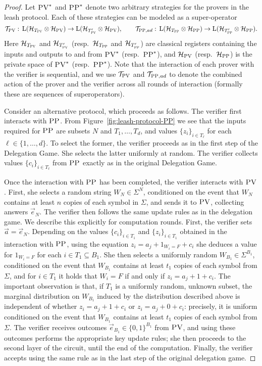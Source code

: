 \documentclass[11pt]{article}
\theoremstyle{remark}
\theoremstyle{definition}
\newcommand{\setft}[1]{\mathrm{#1}}
\newcommand{\Lin}{\setft{L}}
\newcommand{\mH}{\mathcal{H}}
\newcommand{\pv}{\textsc{PV}}
\newcommand{\pp}{\textsc{PP}}
\begin{document}
\begin{proof}
Let $\pv^*$ and $\pp^*$ denote two arbitrary strategies for the provers in the leash protocol. Each of these strategies can be modeled as a super-operator 
$$\mathcal{T}_\pv:\, \Lin(\mH_{T_\pv} \otimes \mH_\pv) \to \Lin(\mH_{T'_\pv} \otimes \mH_\pv), \qquad \mathcal{T}_{\pp,ad}: \,\Lin(\mH_{T_\pp} \otimes \mH_\pp) \to \Lin(\mH_{T'_\pp} \otimes \mH_\pp).$$
Here $\mH_{T_\pv}$ and $\mH_{T'_\pv}$ (resp.\ $\mH_{T_\pp}$ and $\mH_{T'_\pp}$) are classical registers containing the inputs and outputs to and from $\pv^*$ (resp.\ $\pp^*$), and $\mH_\pv$ (resp.\ $\mH_\pp$) is the private space of $\pv^*$ (resp.\ $\pp^*$). Note that the interaction of each prover with the verifier is sequential, and we use $\mathcal{T}_{\pv}$ and $\mathcal{T}_{\pp,ad}$ to denote the combined action of the prover and the verifier across all rounds of interaction (formally these are sequences of superoperators).

Consider an alternative protocol, which proceeds as follows. The verifier first interacts with $\pp$. From Figure~\ref{fig:leash-protocol-PP} we see that the inputs required for $\pp$ are subsets $N$ and $T_1,\ldots,T_d$, and values $\{z_i\}_{i\in T_\ell}$ for each $\ell\in\{1,\ldots,d\}$. To select the former, the verifier proceeds as in the first step of the Delegation Game. She selects the latter uniformly at random. The verifier collects values $\{c_i\}_{i\in T_\ell}$ from $\pp$ exactly as in the original Delegation Game. 

Once the interaction with $\pp$ has been completed, the verifier interacts with $\pv$. First, she selects a random string $W_N\in \Sigma^N$, conditioned on the event that $W_N$ contains at least $n$ copies of each symbol in $\Sigma$, and sends it to $\pv$, collecting answers $\vec{e}_N$. The verifier then follows the same update rules as in the delegation game. We describe this explicitly for computation rounds. First, the verifier sets $\vec{a} = \vec{e}_N$. Depending on the values $\{c_i\}_{i\in T_1}$ and $\{z_i\}_{i\in T_1}$ obtained in the interaction with $\pp$, using the equation $z_i = a_j + 1_{W_i=F}+c_i$ she deduces a value for $1_{W_i=F}$ for each $i\in T_1 \subseteq B_1$. She then selects a uniformly random $W_{B_1} \in \Sigma^{B_1}$, conditioned on the event that $W_{B_1}$ contains at least $t_1$ copies of each symbol from $\Sigma$, and for $i\in T_1$ it holds that $W_i=F$ if and only if $z_i = a_j + 1+c_i$. The important observation is that, if $T_1$ is a uniformly random, unknown subset, the marginal distribution on $W_{B_1}$ induced by the distribution described above is independent of whether $z_i = a_j + 1+c_i$ or $z_i = a_j + 0 +c_i$: precisely, it is uniform conditioned on the event that $W_{B_1}$ contains at least $t_1$ copies of each symbol from $\Sigma$. 
The verifier receives outcomes $\vec{e}_{B_1}\in \{0,1\}^{B_1}$ from $\pv$, and using these outcomes performs the appropriate key update rules; she then proceeds to the second layer of the circuit, until the end of the computation. Finally, the verifier accepts using the same rule as in the last step of the original delegation game. 


\end{proof}
\end{document}
